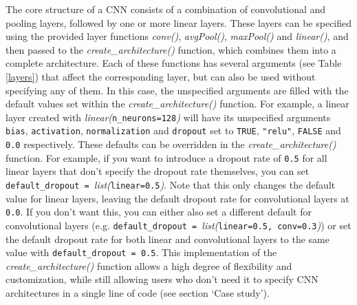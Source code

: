 \documentclass[12pt,twoside]{scrreport}
\newcommand{\pkg}[1]{`#1'}
\newcommand{\fn}[2][]{\textit{#2(}#1\textit{)}}
\newcommand{\val}[1]{\texttt{#1}}
\begin{document}
The core structure of a CNN consists of a combination of convolutional and pooling layers, followed by one or more linear layers. These layers can be specified using the provided layer functions \fn{conv}, \fn{avgPool}, \fn{maxPool} and \fn{linear}, and then passed to the \fn{create\_architecture} function, which combines them into a complete architecture. Each of these functions has several arguments (see Table \ref{layers}) that affect the corresponding layer, but can also be used without specifying any of them. In this case, the unspecified arguments are filled with the default values set within the \fn{create\_architecture} function. For example, a linear layer created with \fn[\val{n\_neurons=128}]{linear} will have its unspecified arguments \val{bias}, \val{activation}, \val{normalization} and \val{dropout} set to \val{TRUE}, \val{"relu"}, \val{FALSE} and \val{0.0} respectively. These defaults can be overridden in the \fn{create\_architecture} function. For example, if you want to introduce a dropout rate of \val{0.5} for all linear layers that don't specify the dropout rate themselves, you can set \val{default\_dropout = }\fn[\val{linear=0.5}]{list}. Note that this only changes the default value for linear layers, leaving the default dropout rate for convolutional layers at \val{0.0}. If you don't want this, you can either also set a different default for convolutional layers (e.g. \val{default\_dropout = }\fn[\val{linear=0.5, conv=0.3}]{list}) or set the default dropout rate for both linear and convolutional layers to the same value with \val{default\_dropout = 0.5}. This implementation of the \fn{create\_architecture} function allows a high degree of flexibility and customization, while still allowing users who don't need it to specify CNN architectures in a single line of code (see section \pkg{Case study}).
\end{document}
